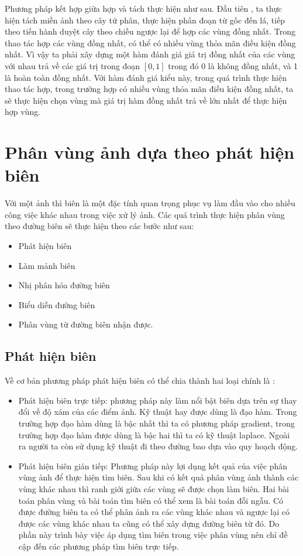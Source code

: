 \documentclass[14pt,oneside,a4paper]{extreport}
\begin{document}
Phương pháp kết hợp giữa hợp và tách thực hiện như sau. Đầu tiên , ta thực hiện tách miền ảnh theo cây tứ phân, thực hiện phân đoạn từ gốc đến lá, tiếp theo tiến hành duyệt cây theo chiều ngược lại để hợp các vùng đồng nhất. Trong thao tác hợp các vùng đồng nhất, có thể có nhiều vùng thỏa mãn điều kiện đồng nhất. Vì vậy ta phải xây dựng một hàm đánh giá giá trị đồng nhất của các vùng với nhau trả về các giá trị trong đoạn $[0,1]$ trong  đó 0 là không đồng nhất, và 1 là hoàn toàn đồng nhất. Với hàm đánh giá kiểu này,  trong quá trình thực hiện thao tác hợp, trong trường hợp có nhiều vùng thỏa mãn điều kiện đồng nhất, ta sẽ thực hiện chọn vùng mà giá trị hàm đồng nhất trả về lớn nhất để thực hiện hợp vùng.
\section{Phân vùng ảnh dựa theo phát hiện biên}
Với một ảnh thì biên là một đặc tính quan trọng phục vụ làm đầu vào cho nhiều công việc khác nhau trong việc xử lý ảnh. 
Các quá trình thực hiện phân vùng theo đường biên sẽ thực hiện theo các bước như sau:
\begin{itemize}
\item Phát hiện biên
\item Làm mảnh biên
\item Nhị phân hóa đường biên
\item Biểu diễn đường biên
\item Phân vùng từ đường biên nhận được.
\end{itemize}
\subsection{Phát hiện biên }
Về cơ bản phương pháp phát hiện biên có thể chia thành hai loại chính là :
\begin{itemize}
\item Phát hiện biên trực tiếp: phương pháp này làm nổi bật biên dựa trên sự thay đổi về độ xám của các điểm ảnh. Kỹ thuật hay được dùng là đạo hàm. Trong trường hợp đạo hàm dùng là bậc nhất thì ta có phương pháp gradient, trong trường hợp đạo hàm được dùng là bậc hai thì ta có kỹ thuật laplace. Ngoài ra người ta còn sử dụng kỹ thuật đi theo đường bao dựa vào quy hoạch động.
\item Phát hiện biên gián tiếp:  Phương pháp này lợi dụng kết quả của việc phân vùng ảnh để thực hiện tìm biên. Sau khi có kết quả phân vùng ảnh thành các vùng khác nhau thì ranh giới giữa các vùng sẽ được chọn làm biên. Hai bài toán phân vùng  và bài toán tìm biên có thể xem là bài toán đỗi ngẫu. Có được đường biên ta có thể phân ảnh ra các vùng khác nhau và ngược lại có được các vùng khác nhau ta cũng có thể xây dựng đường biên từ đó. Do phần này trình bày việc áp dụng tìm biên trong việc phân vùng nên chỉ đề cập đến các phương pháp tìm biên trực tiếp.
\end{itemize}
\end{document}
